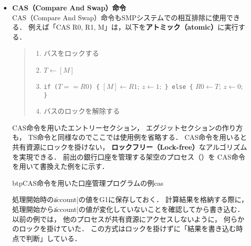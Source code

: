 \begin{itemize}
\begin{quote}
\begin{enumerate}
\item バスをロックする
\item $T \leftarrow [M]$
\item $[M] \leftarrow R$
\item $R \leftarrow T$
\item バスのロックを解除する
\end{enumerate}
\end{quote}

ここで $T$ はCPU内部の一時的なレジスタ
（$T$ レジスタの存在はプログラムから見えない）である．
にSW命令の使用例を示す．
使用例はTS命令のものとよく似ているので解説は省略する．

\begin{myfig}{btp}{SW命令の使用例}{swap}

\end{myfig}

\item {\bf CAS（Compare And Swap）命令}\\
CAS（Compare And Swap）命令もSMPシステムでの相互排除に使用できる．
例えば「CAS  R0, R1, M」は，以下を{\bf アトミック（atomic）}に実行する．

\begin{quote}
\begin{enumerate}
\item バスをロックする
\item $T \leftarrow [M]$
\item {\tt if ($T==R0$) \{} $[M] \leftarrow R1;~ z \leftarrow 1;$
      {\tt \} else \{} $R0 \leftarrow T;~  z \leftarrow 0;$ {\tt \}}
\item バスのロックを解除する
\end{enumerate}
\end{quote}

CAS命令を用いたエントリーセクション，
エグジットセクションの作り方も，
TS命令と同様なのでここでは使用例を省略する．
CAS命令を用いると共有資源にロックを掛けない，
{\bf ロックフリー（Lock-free）}なアルゴリズムを実現できる．
前出の銀行口座を管理する架空のプロセス（）を
CAS命令を用いて書換えた例をに示す．

\begin{myfig}{btp}{CAS命令を用いた口座管理プログラムの例}{cas}

\end{myfig}

処理開始時の\|account|の値をG1に保存しておく．
計算結果を格納する際に，
処理開始から\|account|の値が変化していないことを確認してから書き込む．
以前の例では，
他のプロセスが共有資源にアクセスしないように，
何らかのロックを掛けていた．
この方式はロックを掛けずに「結果を書き込む時点で判断」している．
\end{itemize}

